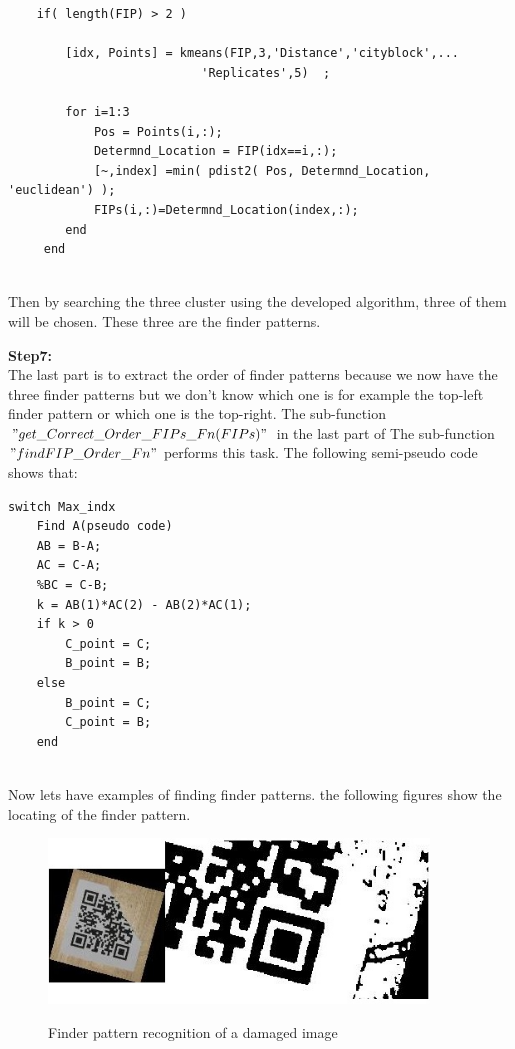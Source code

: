 \begin{lstlisting}
    if( length(FIP) > 2 )

        [idx, Points] = kmeans(FIP,3,'Distance','cityblock',...
                           'Replicates',5)  ;    

        for i=1:3       
            Pos = Points(i,:);
            Determnd_Location = FIP(idx==i,:);       
            [~,index] =min( pdist2( Pos, Determnd_Location, 'euclidean') );
            FIPs(i,:)=Determnd_Location(index,:); 
        end
     end
                    
\end{lstlisting}

Then by searching the three cluster using the developed algorithm, three of them will be chosen. These three are the finder patterns.


\textbf{Step7:}\\ The last part is to extract the order of finder patterns because we now have the three finder patterns but we don't know which one is for example the top-left finder pattern or which one is the top-right. The sub-function $"get\_Correct\_Order\_FIPs\_Fn(FIPs)"$ in the last part of The sub-function $"findFIP\_Order\_Fn"$ performs this task. The following semi-pseudo code shows that:

\begin{lstlisting}
switch Max_indx
    Find A(pseudo code)
    AB = B-A;
    AC = C-A;
    %BC = C-B;
    k = AB(1)*AC(2) - AB(2)*AC(1);
    if k > 0
        C_point = C;
        B_point = B;
    else
        B_point = C;
        C_point = B;
    end
                    
\end{lstlisting}

Now lets have examples of finding finder patterns. the following figures show the locating of the finder pattern.
\begin{figure}[H]
  \caption{Finder pattern recognition of a damaged image}
  \centering
    \includegraphics[width=0.9\textwidth]{figures/finderpattern1.jpg}
    \label{fig:3.2}
\end{figure}


